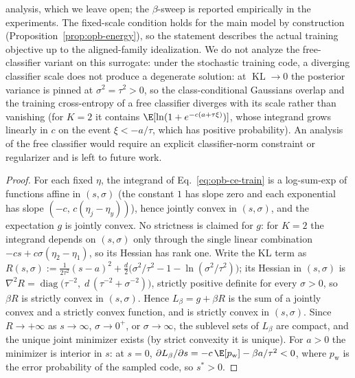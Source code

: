 \begin{proposition}
analysis, which we leave open; the $\beta$-sweep is reported empirically in the
experiments. The fixed-scale condition holds for the main model by construction
(Proposition~\ref{prop:opb-energy}), so the statement describes the actual training
objective up to the aligned-family idealization. We do not analyze the free-classifier
variant on this surrogate: under the stochastic training code, a diverging classifier
scale does not produce a degenerate solution: at $\operatorname{KL} \to 0$ the
posterior variance is pinned at $\sigma^2 = \tau^2 > 0$, so the class-conditional
Gaussians overlap and the training cross-entropy of a free classifier diverges with
its scale rather than vanishing (for $K = 2$ it contains
$\E[\ln(1 + e^{-c(a + \tau\xi)})]$, whose integrand grows linearly in $c$ on the
event $\xi < -a/\tau$, which has positive probability). An analysis of the free
classifier would require an explicit classifier-norm constraint or regularizer and is
left to future work.
\end{proposition}

\begin{proof}
For each fixed $\eta$, the integrand of Eq.~\eqref{eq:opb-ce-train} is a log-sum-exp of
functions affine in $(s, \sigma)$ (the constant $1$ has slope zero and each exponential
has slope $(-c,\, c(\eta_j - \eta_y))$), hence jointly convex in $(s, \sigma)$, and the
expectation $g$ is jointly convex. No strictness is claimed for $g$: for $K = 2$ the
integrand depends on $(s, \sigma)$ only through the single linear combination
$-cs + c\sigma(\eta_2 - \eta_1)$, so its Hessian has rank one. Write the KL term as
$R(s, \sigma) := \tfrac{1}{2\tau^2}(s-a)^2
+ \tfrac{d}{2}\bigl(\sigma^2/\tau^2 - 1 - \ln(\sigma^2/\tau^2)\bigr)$; its Hessian in
$(s, \sigma)$ is
$\nabla^2 R = \operatorname{diag}\bigl(\tau^{-2},\; d\,(\tau^{-2} + \sigma^{-2})\bigr)$,
strictly positive definite for every $\sigma > 0$, so $\beta R$ is strictly convex in
$(s, \sigma)$. Hence $L_\beta = g + \beta R$ is the sum of a jointly convex and a
strictly convex function, and is strictly convex in $(s, \sigma)$. Since
$R \to +\infty$ as $s \to \infty$, $\sigma \to 0^+$, or $\sigma \to \infty$, the
sublevel sets of $L_\beta$ are compact, and the unique joint minimizer exists (by
strict convexity it is unique). For $a > 0$ the minimizer is interior in $s$: at
$s = 0$, $\partial L_\beta/\partial s = -c\,\E[p_{\mathrm{w}}] - \beta a/\tau^2 < 0$,
where $p_{\mathrm{w}}$ is the error probability of the sampled code, so $s^* > 0$.
\end{proof}

